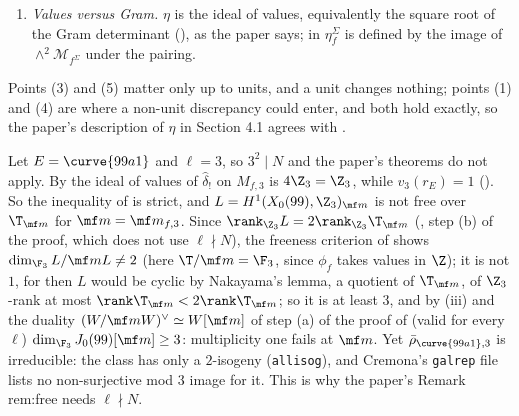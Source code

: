 \begin{remark}
\begin{enumerate}[label=(\arabic*)]
where $\mathcal M[I]$ is the kernel of $(x_1,\dots,x_r)\colon\mathcal M\to\mathcal M^r$ for generators $x_i$ of $I$, Section 1.1.2), and not the image of $L$ under the projection to the $f$-component (the dual lattice,
which would change the ideal of values by the congruence ideal).
\item \emph{Values versus Gram.} $\eta$ is the ideal of values, equivalently the square root of the Gram determinant (), as the paper says; in \cite[Section 1.7.3]{DFG04}
$\eta^\Sigma_f$ is defined by the image of $\wedge^2\mathcal M_{f^\Sigma}$ under the pairing.
\end{enumerate}
Points (3) and (5) matter only up to units, and a unit changes nothing; points (1) and (4) are where a non-unit discrepancy could enter, and both hold exactly, so the paper's
description of $\eta$ in Section 4.1 agrees with .
\end{remark}

\begin{example}[\curve{99a1} at $\ell=3$]\label{ex:moddeg:99-at-3}
Let $E=\curve{99a1}$ and $\ell=3$, so $3^2\mid N$ and the paper's theorems do not apply. By  the ideal of values of $\hat\delta_!$ on $M_{f,3}$ is $4\Z_3=\Z_3$, while
$v_3(r_E)=1$ (). So the inequality of  is strict, and $L=H^1(X_0(99),\Z_3)_{\mf m}$ is not free over $\T_{\mf m}$ for $\mf m=\mf m_{f,3}$.
Since $\rank_{\Z_3}L=2\rank_{\Z_3}\T_{\mf m}$ (, step (b) of the proof, which does not use $\ell\nmid N$), the freeness criterion of  shows
$\dim_{\F_3}L/\mf mL\ne2$ (here $\T/\mf m=\F_3$, since $\phi_f$ takes values in $\Z$); it is not $1$, for then $L$ would be cyclic by Nakayama's lemma, a quotient of $\T_{\mf m}$, of
$\Z_3$-rank at most $\rank\T_{\mf m}<2\rank\T_{\mf m}$; so it is at least $3$, and by (iii) and the duality $(W/\mf mW)^\vee\simeq W[\mf m]$ of step (a) of the proof of  (valid for every $\ell$)
$\dim_{\F_3}J_0(99)[\mf m]\ge3$: multiplicity one fails at $\mf m$. Yet $\bar\rho_{\curve{99a1},3}$ is irreducible: the class  has only a $2$-isogeny (\texttt{allisog}), and Cremona's
\texttt{galrep} file lists no non-surjective mod $3$ image for it. This is why the paper's Remark rem:free needs $\ell\nmid N$.
\end{example}


